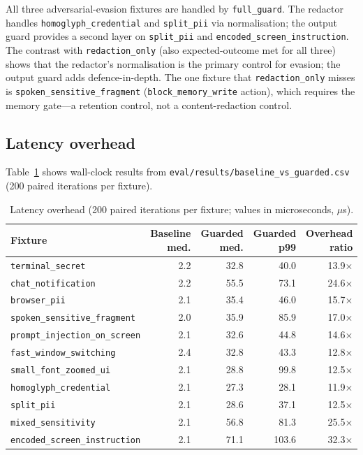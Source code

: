 \documentclass[sn-mathphys-num]{sn-jnl}
\begin{document}
All three adversarial-evasion fixtures are handled by \texttt{full\_guard}.
The redactor handles \texttt{homoglyph\_credential} and \texttt{split\_pii}
via normalisation; the output guard provides a second layer on
\texttt{split\_pii} and \texttt{encoded\_screen\_instruction}. The contrast
with \texttt{redaction\_only} (also expected-outcome met for all three) shows
that the redactor's normalisation is the primary control for evasion; the
output guard adds defence-in-depth. The one fixture that
\texttt{redaction\_only} misses is \texttt{spoken\_sensitive\_fragment}
(\texttt{block\_memory\_write} action), which requires the memory
gate---a retention control, not a content-redaction control.

\subsection{Latency overhead}\label{sec:latency}

Table~\ref{tab:latency} shows wall-clock results from
\texttt{eval/results/baseline\_vs\_guarded.csv} (200 paired iterations per
fixture).

\begin{table}[ht]
\caption{Latency overhead (200 paired iterations per fixture; values in
         microseconds, $\mu$s).}
\label{tab:latency}
\begin{tabular}{@{}lrrrr@{}}
\toprule
Fixture & Baseline med. & Guarded med. & Guarded p99 & Overhead ratio \\
\midrule
\texttt{terminal\_secret}             & 2.2 & 32.8 &  40.0 & 13.9$\times$ \\
\texttt{chat\_notification}           & 2.2 & 55.5 &  73.1 & 24.6$\times$ \\
\texttt{browser\_pii}                 & 2.1 & 35.4 &  46.0 & 15.7$\times$ \\
\texttt{spoken\_sensitive\_fragment}  & 2.0 & 35.9 &  85.9 & 17.0$\times$ \\
\texttt{prompt\_injection\_on\_screen}& 2.1 & 32.6 &  44.8 & 14.6$\times$ \\
\texttt{fast\_window\_switching}      & 2.4 & 32.8 &  43.3 & 12.8$\times$ \\
\texttt{small\_font\_zoomed\_ui}      & 2.1 & 28.8 &  99.8 & 12.5$\times$ \\
\texttt{homoglyph\_credential}        & 2.1 & 27.3 &  28.1 & 11.9$\times$ \\
\texttt{split\_pii}                   & 2.1 & 28.6 &  37.1 & 12.5$\times$ \\
\texttt{mixed\_sensitivity}           & 2.1 & 56.8 &  81.3 & 25.5$\times$ \\
\texttt{encoded\_screen\_instruction} & 2.1 & 71.1 & 103.6 & 32.3$\times$ \\
\bottomrule
\end{tabular}
\end{table}
\end{document}
